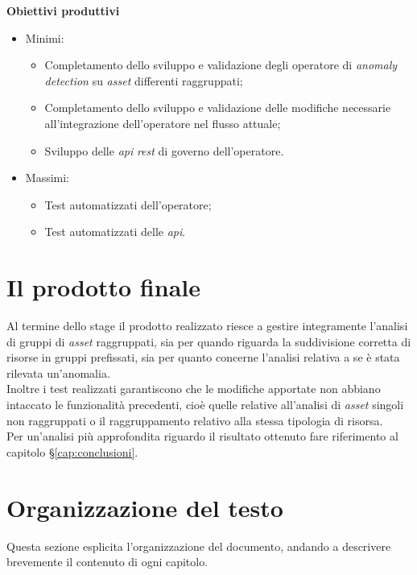 \noindent \textbf{Obiettivi produttivi}
\begin{itemize}
	\item{Minimi:
		\begin{itemize}
			\item{Completamento dello sviluppo e validazione degli operatore di \textit{anomaly detection} su \textit{asset} differenti raggruppati;}
			\item{Completamento dello sviluppo e validazione delle modifiche necessarie all'integrazione dell'operatore nel flusso attuale;}
			\item{Sviluppo delle \textit{\gls{api}} \textit{\gls{rest}} di governo dell'operatore.}
		\end{itemize}			
	}
	\item{Massimi:
		\begin{itemize}
			\item{Test automatizzati dell'operatore;}
			\item{Test automatizzati delle \textit{\gls{api}}.}
		\end{itemize}			
	}
\end{itemize}


\section{Il prodotto finale}
Al termine dello stage il prodotto realizzato riesce a gestire integramente l'analisi di gruppi di \textit{asset} raggruppati, sia per quando riguarda la suddivisione corretta di risorse in gruppi prefissati, sia per quanto concerne l'analisi relativa a se è stata rilevata un'anomalia.\\
Inoltre i test realizzati garantiscono che le modifiche apportate non abbiano intaccato le funzionalità precedenti, cioè quelle relative all'analisi di \textit{asset} singoli non raggruppati o il raggruppamento relativo alla stessa tipologia di risorsa.\\
Per un'analisi più approfondita riguardo il risultato ottenuto fare riferimento al capitolo \S\ref{cap:conclusioni}.




\section{Organizzazione del testo}
Questa sezione esplicita l'organizzazione del documento, andando a descrivere brevemente il contenuto di ogni capitolo.

